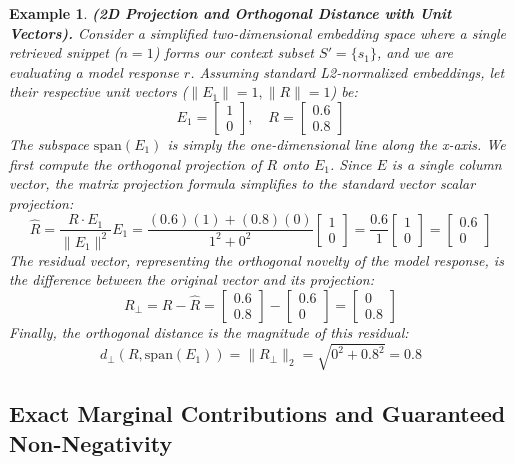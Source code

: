 \documentclass{article}
\newtheorem{example}{Example}
\begin{document}
\begin{example}
\textbf{(2D Projection and Orthogonal Distance with Unit Vectors).}
Consider a simplified two-dimensional embedding space where a single retrieved snippet ($n=1$) forms our context subset $S' = \{s_1\}$, and we are evaluating a model response $r$. Assuming standard L2-normalized embeddings, let their respective unit vectors ($\|E_1\| = 1, \|R\| = 1$) be:
$$ E_1 = \begin{bmatrix} 1 \\ 0 \end{bmatrix}, \quad R = \begin{bmatrix} 0.6 \\ 0.8 \end{bmatrix} $$
The subspace $\text{span}(E_1)$ is simply the one-dimensional line along the x-axis. We first compute the orthogonal projection of $R$ onto $E_1$. Since $E$ is a single column vector, the matrix projection formula simplifies to the standard vector scalar projection:
$$ \hat{R} = \frac{R \cdot E_1}{\|E_1\|^2} E_1 = \frac{(0.6)(1) + (0.8)(0)}{1^2 + 0^2} \begin{bmatrix} 1 \\ 0 \end{bmatrix} = \frac{0.6}{1} \begin{bmatrix} 1 \\ 0 \end{bmatrix} = \begin{bmatrix} 0.6 \\ 0 \end{bmatrix} $$
The residual vector, representing the orthogonal novelty of the model response, is the difference between the original vector and its projection:
$$ R_{\perp} = R - \hat{R} = \begin{bmatrix} 0.6 \\ 0.8 \end{bmatrix} - \begin{bmatrix} 0.6 \\ 0 \end{bmatrix} = \begin{bmatrix} 0 \\ 0.8 \end{bmatrix} $$
Finally, the orthogonal distance is the magnitude of this residual:
$$ d_{\perp}(R, \text{span}(E_1)) = \|R_{\perp}\|_2 = \sqrt{0^2 + 0.8^2} = 0.8 $$
\end{example}

\subsection{Exact Marginal Contributions and Guaranteed Non-Negativity}
\end{document}
